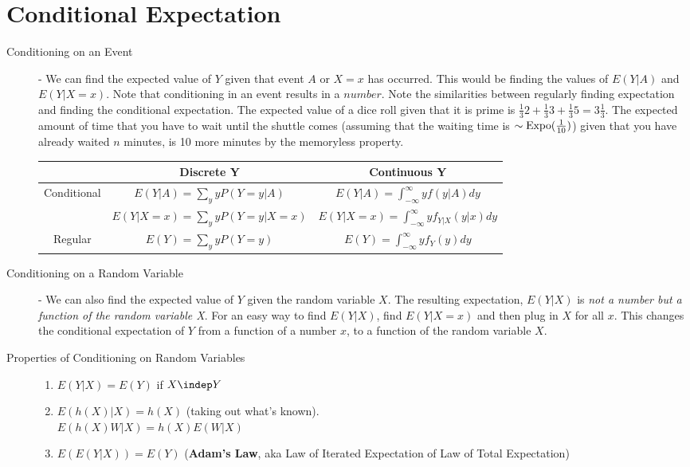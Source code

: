 \documentclass[11pt]{article}
\begin{document}
\section*{Conditional Expectation}
\begin{description}
  \item[Conditioning on an Event] - We can find the expected value of $Y$ given that event $A$ or $X=x$ has occurred. This would be finding the values of $E(Y|A)$ and $E(Y|X = x)$. Note that conditioning in an event results in a $number$. Note the similarities between regularly finding expectation and finding the conditional expectation. The expected value of a dice roll given that it is prime is $\frac{1}{3}2 + \frac{1}{3}3 + \frac{1}{3}5 = 3\frac{1}{3}$. The expected amount of time that you have to wait until the shuttle comes (assuming that the waiting time is $\sim \textrm{Expo}(\frac{1}{10})$) given that you have already waited $n$ minutes, is 10 more minutes by the memoryless property.
    \begin{table}[htb!]
       \centering
      \begin{tabular}{ccc}
      \toprule
         ~& \textbf{Discrete Y} & \textbf{Continuous Y} \\
      \midrule
         Conditional & $E(Y|A) = \sum_y yP(Y=y|A)$ & $E(Y|A) = \int_{-\infty}^\infty yf(y|A)dy$ \\
         ~ & $E(Y|X=x) = \sum_y yP(Y=y|X=x)$ & $E(Y|X=x) =\int_{-\infty}^\infty yf_{Y|X}(y|x)dy$ \\
      \midrule
      Regular & $E(Y) = \sum_y yP(Y=y)$ & $E(Y) =\int_{-\infty}^\infty yf_Y(y)dy$ \\

      \bottomrule
      \end{tabular}
    \end{table}
  \vspace{-.45 cm}
  \item[Conditioning on a Random Variable] - We can also find the expected value of $Y$ given the random variable $X$. The resulting expectation, $E(Y|X)$ is \emph{not a number but a function of the random variable X}. For an easy way to find $E(Y|X)$, find $E(Y|X = x)$ and then plug in $X$ for all $x$. This changes the conditional expectation of $Y$ from a function of a number $x$, to a function of the random variable $X$.
  \item[Properties of Conditioning on Random Variables] \quad
  \begin{enumerate}
    \item $E(Y|X) = E(Y)$ if $X \indep Y$
    \item $E(h(X)|X) = h(X)$ (taking out what's known). \\
      $E(h(X)W|X) = h(X)E(W|X)$
    \item $E(E(Y|X)) = E(Y)$ (\textbf{Adam's Law}, aka Law of Iterated Expectation of Law of Total Expectation)
  \end{enumerate}


\end{description}
\end{document}
